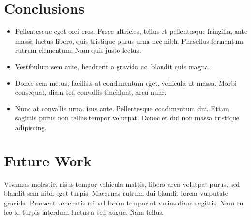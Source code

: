 \documentclass[a0,portrait]{a0poster}
\begin{document}
\begin{multicols}{2}

\color{SaddleBrown} %

\section*{Conclusions}

\begin{itemize}
\item Pellentesque eget orci eros. Fusce ultricies, tellus et pellentesque fringilla, ante massa luctus libero, quis tristique purus urna nec nibh. Phasellus fermentum rutrum elementum. Nam quis justo lectus.
\item Vestibulum sem ante, hendrerit a gravida ac, blandit quis magna.
\item Donec sem metus, facilisis at condimentum eget, vehicula ut massa. Morbi consequat, diam sed convallis tincidunt, arcu nunc.
\item Nunc at convallis urna. isus ante. Pellentesque condimentum dui. Etiam sagittis purus non tellus tempor volutpat. Donec et dui non massa tristique adipiscing.
\end{itemize}

\color{DarkSlateGray} %


\section*{Future Work}

Vivamus molestie, risus tempor vehicula mattis, libero arcu volutpat purus, sed blandit sem nibh eget turpis. Maecenas rutrum dui blandit lorem vulputate gravida. Praesent venenatis mi vel lorem tempor at varius diam sagittis. Nam eu leo id turpis interdum luctus a sed augue. Nam tellus.



\end{multicols}
\end{document}
